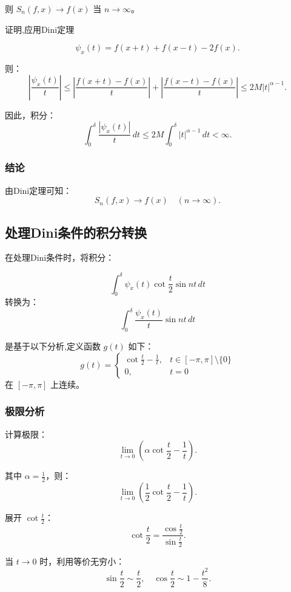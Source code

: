 \documentclass[12pt]{article}
\begin{document}
	则 \( S_n(f, x) \to f(x) \) 当 \( n \to \infty \)。
	
证明,应用Dini定理

	\[
	\psi_x(t) = f(x+t) + f(x-t) - 2f(x).
	\]
	
	则：
	\[
	\left| \frac{\psi_x(t)}{t} \right| \leq \left| \frac{f(x+t) - f(x)}{t} \right| + \left| \frac{f(x-t) - f(x)}{t} \right| \leq 2M |t|^{\alpha - 1}.
	\]
	
	因此，积分：
	\[
	\int_0^\delta \frac{|\psi_x(t)|}{t} \, dt \leq 2M \int_0^\delta |t|^{\alpha - 1} \, dt < \infty.
	\]
	
	\subsubsection{结论}
	
	由Dini定理可知：
	\[
	S_n(f, x) \to f(x) \quad (n \to \infty).
	\]
	

	\subsection{处理Dini条件的积分转换}
	
	在处理Dini条件时，将积分：

\[
\int_0^\delta \psi_x(t) \cot \frac{t}{2} \sin nt \, dt
\]
转换为：
\[
\int_0^\delta \frac{\psi_x(t)}{t} \sin nt \, dt
\]
	
	是基于以下分析,定义函数 \( g(t) \) 如下：
	\[
	g(t) = 
	\begin{cases} 
		\cot \frac{t}{2} - \frac{1}{t}, & t \in [-\pi, \pi] \setminus \{0\} \\
		0, & t = 0
	\end{cases}
	\]
	在 \([- \pi, \pi]\) 上连续。
	
	\subsubsection{极限分析}
	
	计算极限：
\[
\lim_{t \to 0} \left( \alpha \cot \frac{t}{2} - \frac{1}{t} \right).
\]

其中 \(\alpha = \frac{1}{2}\)，则：
\[
\lim_{t \to 0} \left( \frac{1}{2} \cot \frac{t}{2} - \frac{1}{t} \right).
\]

展开 \(\cot \frac{t}{2}\)：
\[
\cot \frac{t}{2} = \frac{\cos \frac{t}{2}}{\sin \frac{t}{2}}.
\]

当 \( t \to 0 \) 时，利用等价无穷小：
\[
\sin \frac{t}{2} \sim \frac{t}{2}, \quad \cos \frac{t}{2} \sim 1 - \frac{t^2}{8}.
\]
\end{document}
